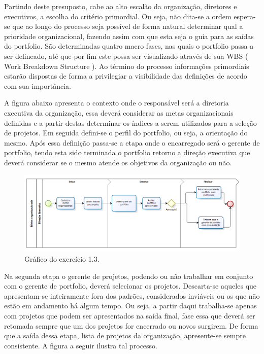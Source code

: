 \documentclass[12pt,a4paper,ruledheader,tocpage=prefix,floatnumber=continuous,pagestart=folhaderosto,font=times]{abnt}
\begin{document}
Partindo deste presuposto, cabe ao alto escalão da organização, diretores e executivos, a escolha do critério primordial. Ou seja, não dita-se a ordem 
espera-se que ao longo do processo seja possível de forma natural determinar qual a prioridade organizacional, fazendo assim com que esta seja o guia para 
as saídas do portfolio. São determinadas quatro macro fases, nas quais o portfolio passa a ser delineado, até que por fim este possa ser visualizado através 
de sua WBS ( Work Breakdown Structure ). Ao término do processo informações primordiais estarão dispostas de forma a privilegiar a visibilidade das 
definições de acordo com sua importância.

A figura abaixo apresenta o contexto onde o responsável será a diretoria executiva da organização, essa deverá considerar as metas organizacionais 
definidas e a partir destas determinar os índices a serem utilizados para a seleção de projetos. Em seguida defini-se o perfil do portfolio, ou seja, a 
orientação do mesmo. Após essa definição passa-se a etapa onde o encarregado será o gerente de portfolio, tendo esta sido terminada o portfolio retorno 
a direção executiva que deverá considerar se o mesmo atende os objetivos da organização ou não.

\begin{figure}[H]
\centering
\includegraphics[width=.9\textwidth]{DirecaoExecutiva.png}
\caption{Gráfico do exercício 1.3.}
\end{figure}

Na segunda etapa o gerente de projetos, podendo ou não trabalhar em conjunto com o gerente de portfolio, deverá selecionar os projetos. Descarta-se 
aqueles que apresentam-se inteiramente fora dos padrões, considerados inviáveis ou os que não estão em andamento há algum tempo. Ou seja, a partir daqui 
trabalha-se apenas com projetos que podem ser apresentados na saída final, fase essa que deverá ser retomada sempre que um dos projetos for encerrado ou 
novos surgirem. De forma que a saída dessa etapa, lista de projetos da organização, apresente-se sempre consistente. A figura a seguir ilustra tal 
processo.
\end{document}
